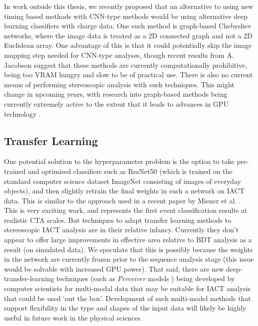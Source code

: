 In work outside this thesis, we recently proposed that an alternative to using new timing based methods with CNN-type methods would be using alternative deep learning classifiers with charge data. One such method is graph-based Chebyshev networks, where the image data is treated as a 2D connected graph and not a 2D Euclidean array. One advantage of this is that it could potentially skip the image mapping step needed for CNN-type analyses, though recent results from A. Jacobson \cite{adithesis} suggest that these methods are currently computationally prohibitive, being too VRAM hungry and slow to be of practical use. There is also no current means of performing stereoscopic analysis with such techniques. This might change in upcoming years, with research into graph-based methods being currently extremely active to the extent that it leads to advances in GPU technology  \cite{graphcore}.

\subsection{Transfer Learning}
One potential solution to the hyperparameter problem is the option to take pre-trained and optimised classifiers such as ResNet50 \cite{resnet50} (which is trained on the standard computer science dataset ImageNet \cite{ImageNet} consisting of images of everyday objects), and then slightly retrain the final weights in such a network on IACT data. This is similar to the approach used in a recent paper by Miener et al. \cite{tjarkicrc}. This is very exciting work, and represents the first event classification results at realistic CTA scales. But techniques to adapt transfer learning methods to stereoscopic IACT analysis are in their relative infancy. Currently they don't appear to offer large improvements in effective area relative to BDT analysis as a result (on simulated data). We speculate that this is possibly because the weights in the network are currently frozen prior to the sequence analysis stage (this issue would be solvable with increased GPU power). That said, there are new deep-transfer-learning techniques (such as \textit{Perceiver} models \cite{perceiver}) being developed by computer scientists for multi-modal data that may be suitable for IACT analysis that could be used `out the box'. Development of such multi-model methods that support flexibility in the type and shapes of the input data will likely be highly useful in future work in the physical sciences.


